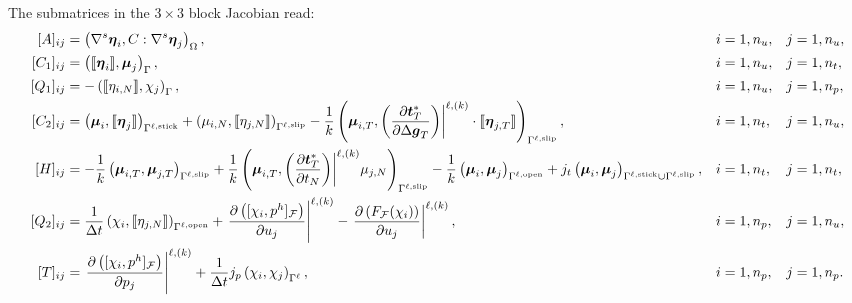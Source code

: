 \documentclass[3p,times]{elsarticle}
\theoremstyle{plain}
\newcommand{\Mat}[1]{#1}
\newcommand{\tensorOne}[1]{\boldsymbol#1}
\newcommand{\tensorFour}[1]{\textbf{\sffamily #1}}
\begin{document}
The submatrices in the $3 \times 3$ block Jacobian read:
  \small
  \begin{subequations}
    \begin{align}
      [\Mat{A}]_{ij} &
      = \left(\nabla^s \tensorOne{\eta}_i,\tensorFour{C}:\nabla^s
        \tensorOne{\eta}_j\right)_{\Omega}, && i=1,n_u, && j=1,n_u,
      \\
      [\Mat{C}_1]_{ij} &
      = \left( \llbracket \tensorOne{ \eta }_i \rrbracket, \tensorOne{\mu}_j
        \right)_{\Gamma}, && i=1,n_u, && j=1,n_t,
      \\
      [\Mat{Q}_1]_{ij} &
      = -\left( \llbracket \eta_{i,N} \rrbracket, \chi_j \right)_{\Gamma}, && i=1,n_u, && j=1,n_p,
      \label{eq:Q1def} \\
      [\Mat{C}_2]_{ij} &
      = \left( \tensorOne{\mu}_i, \llbracket \tensorOne{\eta}_j \rrbracket
        \right)_{\Gamma^{\ell,\text{stick}}}
      + \left( {\mu}_{i,N}, \llbracket {\eta}_{j,N} \rrbracket
        \right)_{\Gamma^{\ell,\text{slip}}}
      - \frac{1}{k}\left( \tensorOne{\mu}_{i,T}, \left( \frac{\partial \tensorOne{t}_T^*}
        {\partial \Delta \tensorOne{g}_T} \right) \biggr|^{\ell,(k)} \cdot \llbracket
        \tensorOne{\eta}_{j,T} \rrbracket \right)_{\Gamma^{\ell,\text{slip}}}, && i=1,n_t, && j=1,n_u,
      \label{eq:C2def} \\
      [\Mat{H}]_{ij} &
      = -\frac{1}{k}\left( \tensorOne{\mu}_{i,T}, \tensorOne{\mu}_{j,T}
        \right)_{\Gamma^{\ell,\text{slip}}}
      + \frac{1}{k}\left( \tensorOne{\mu}_{i,T}, \left( \frac{\partial \tensorOne{t}_T^*}
        {\partial t_N} \right) \biggr|^{\ell,(k)} \mu_{j,N} \right)_{\Gamma^
        {\ell,\text{slip}}}
      - \frac{1}{k}\left( \tensorOne{\mu}_{i}, \tensorOne{\mu}_{j}
        \right)_{\Gamma^{\ell,\text{open}}}
      + j_t\left( \tensorOne{\mu}_{i}, \tensorOne{\mu}_{j} \right)_{\Gamma^{\ell,\text{stick}}\cup\Gamma^{\ell,\text{slip}}}, && i=1,n_t, && j=1,n_t,
      \label{eq:Hdef} \\
      [\Mat{Q}_2]_{ij} &
      = \frac{1}{\Delta t} \left( \chi_i, \llbracket \eta_{j,N} \rrbracket
        \right)_{\Gamma^{\ell,\text{open}} }
      + \left.\frac{\partial \left( [ \chi_i, p^h ]_{\mathcal{F}} \right) }{\partial u_j }
        \right|^{\ell,(k)}
      - \left.\frac{\partial \left( F_{\mathcal{F}}( \chi_i ) \right) }{\partial u_j }
        \right|^{\ell,(k)}, && i=1,n_p, && j=1,n_u,
      \label{eq:Q2def} \\
      [\Mat{T}]_{ij} &
      = \left.\frac{\partial \left( [ \chi_i, p^h ]_{\mathcal{F}} \right) }{\partial p_j }
        \right|^{\ell,(k)}
      + \frac{1}{\Delta t} j_p\left( {\chi}_{i}, {\chi}_{j} \right)_{\Gamma^{\ell}}, && i=1,n_p, && j=1,n_p.
    \end{align}
    \label{eq:block_def}\null
  \end{subequations}
\end{document}
